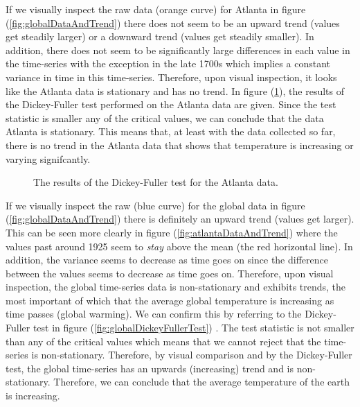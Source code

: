 \documentclass[12pt]{report}
\begin{document}
\noindent If we visually inspect the raw data (orange curve) for Atlanta in figure (\ref{fig:globalDataAndTrend}) there does not seem to be an upward trend (values get steadily larger) or a downward trend (values get steadily smaller). In addition, there does not seem to be significantly large differences in each value in the time-series with the exception in the late 1700s which implies a constant variance in time in this time-series. Therefore, upon visual inspection, it looks like the Atlanta data is stationary and has no trend. In figure (\ref{fig:atlantaDickeyFullerTest}), the results of the Dickey-Fuller test performed on the Atlanta data are given. Since the test statistic is smaller any of the critical values, we can conclude that the data Atlanta is stationary. This means that, at least with the data collected so far, there is no trend in the Atlanta data that shows that temperature is increasing or varying signifcantly. \\

\begin{figure}
	\caption{\label{fig:atlantaDickeyFullerTest} The results of the Dickey-Fuller test for the Atlanta data.}
\end{figure}

\noindent If we visually inspect the raw (blue curve) for the global data in figure (\ref{fig:globalDataAndTrend}) there is definitely an upward trend (values get larger). This can be seen more clearly in figure (\ref{fig:atlantaDataAndTrend}) where the values past around 1925 seem to \textit{stay} above the mean (the red horizontal line).  In addition, the variance seems to decrease as time goes on since the difference between the values seems to decrease as time goes on. Therefore, upon visual inspection, the global time-series data is non-stationary and exhibits trends, the most important of which that the average global temperature is increasing as time passes (global warming). We can confirm this by referring to the Dickey-Fuller test in figure (\ref{fig:globalDickeyFullerTest}) . The test statistic is not smaller than any of the critical values which means that we cannot reject that the time-series is non-stationary. Therefore, by visual comparison and by the Dickey-Fuller test, the global time-series has an upwards (increasing) trend and is non-stationary. Therefore, we can conclude that the average temperature of the earth is increasing. 
\end{document}
